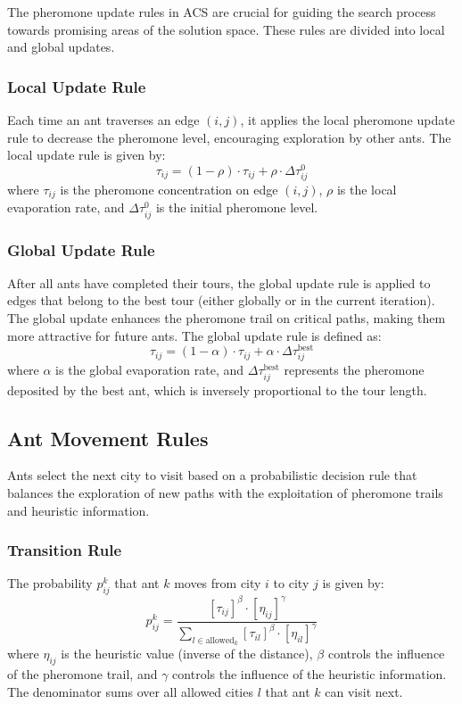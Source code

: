 The pheromone update rules in ACS are crucial for guiding the search process towards promising areas of the solution space. These rules are divided into local and global updates.

\subsubsection{Local Update Rule}
Each time an ant traverses an edge $(i,j)$, it applies the local pheromone update rule to decrease the pheromone level, encouraging exploration by other ants. The local update rule is given by:
\[
	\tau_{ij} = (1 - \rho) \cdot \tau_{ij} + \rho \cdot \Delta \tau_{ij}^0
\]
where $\tau_{ij}$ is the pheromone concentration on edge $(i,j)$, $\rho$ is the local evaporation rate, and $\Delta \tau_{ij}^0$ is the initial pheromone level.

\subsubsection{Global Update Rule}
After all ants have completed their tours, the global update rule is applied to edges that belong to the best tour (either globally or in the current iteration). The global update enhances the pheromone trail on critical paths, making them more attractive for future ants. The global update rule is defined as:
\[
	\tau_{ij} = (1 - \alpha) \cdot \tau_{ij} + \alpha \cdot \Delta \tau_{ij}^{\text{best}}
\]
where $\alpha$ is the global evaporation rate, and $\Delta \tau_{ij}^{\text{best}}$ represents the pheromone deposited by the best ant, which is inversely proportional to the tour length.

\subsection{Ant Movement Rules}

Ants select the next city to visit based on a probabilistic decision rule that balances the exploration of new paths with the exploitation of pheromone trails and heuristic information.

\subsubsection{Transition Rule}
The probability $p_{ij}^k$ that ant $k$ moves from city $i$ to city $j$ is given by:
\[
	p_{ij}^k = \frac{[\tau_{ij}]^\beta \cdot [\eta_{ij}]^\gamma}{\sum_{l \in \text{allowed}_k} [\tau_{il}]^\beta \cdot [\eta_{il}]^\gamma}
\]
where $\eta_{ij}$ is the heuristic value (inverse of the distance), $\beta$ controls the influence of the pheromone trail, and $\gamma$ controls the influence of the heuristic information. The denominator sums over all allowed cities $l$ that ant $k$ can visit next.

